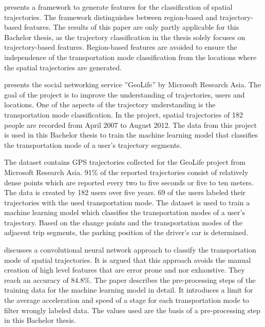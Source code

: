 \cite{lee2008traclass} presents a framework to generate features for the classification of spatial trajectories. The framework distinguishes between region-based and trajectory-based features.  \newline
The results of this paper are only partly applicable for this Bachelor thesis, as the trajectory classification in the thesis solely focuses on trajectory-based features. Region-based features are avoided to ensure the independence of the transportation mode classification from the locations where the spatial trajectories are generated.

\cite{zheng2010geolife} presents the social networking service ''GeoLife'' by Microsoft Research Asia. The goal of the project is to improve the understanding of trajectories, users and locations. One of the aspects of the trajectory understanding is the transportation mode classification. In the project, spatial trajectories of 182 people are recorded from April 2007 to August 2012.\newline
The data from this project is used in this Bachelor thesis to train the machine learning model that classifies the transportation mode of a user's trajectory segments.

The dataset \cite{zheng2008understanding}\cite{zheng2010geolife}\cite{geolife-dataset}\cite{zheng2009mining} contains GPS trajectories collected for the GeoLife project from Microsoft Research Asia. 91\% of the reported trajectories consist of relatively dense points which are reported every two to five seconds or five to ten meters. The data is created by 182 users over five years. 69 of the users labeled their trajectories with the used transportation mode. \newline
The dataset is used to train a machine learning model which classifies the transportation modes of a user's trajectory. Based on the change points and the transportation modes of the adjacent trip segments, the parking position of the driver's car is determined. 

\cite{Dabiri2018} discusses a convolutional neural network approach to classify the transportation mode of spatial trajectories. It is argued that this approach avoids the manual creation of high level features that are error prone and nor exhaustive. They reach an accuracy of 84.8\%.\newline
The paper describes the pre-processing steps of the training data for the machine learning model in detail. It introduces a limit for the average acceleration and speed of a stage for each transportation mode to filter wrongly labeled data. The values used are the basis of a pre-processing step in this Bachelor thesis.
